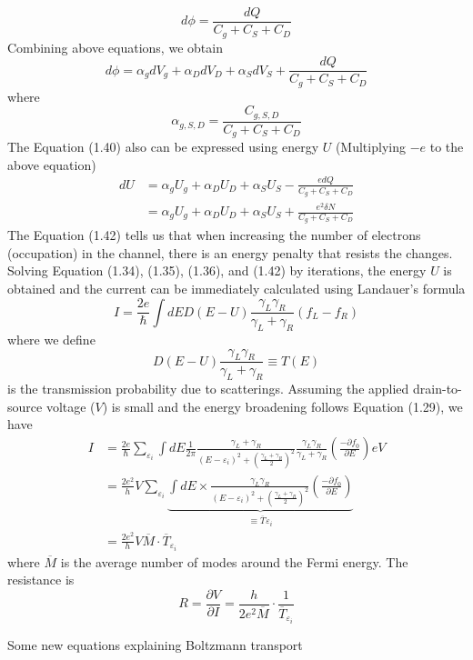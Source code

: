 \begin{equation}
    d\phi = \frac{dQ}{C_{g}+C_{S}+C_{D}}
\end{equation} Combining above equations, we obtain \begin{equation}
    d\phi = \alpha_{g} dV_{g} + \alpha_{D} dV_{D} + \alpha_{S} dV_{S} + \frac{dQ}{C_{g}+C_{S}+C_{D}}
\end{equation} where \begin{equation}
    \alpha_{g,S,D} = \frac{C_{g,S,D}}{C_{g}+C_{S}+C_{D}}
\end{equation} The Equation (1.40) also can be expressed using energy $U$ (Multiplying $-e$ to the above equation) 
\begin{align}
    dU& = \alpha_{g} U_{g} + \alpha_{D} U_{D} + \alpha_{S} U_{S} - \frac{edQ}{C_{g}+C_{S}+C_{D}}\nonumber\\
    & = \alpha_{g} U_{g} + \alpha_{D} U_{D} + \alpha_{S} U_{S} + \frac{e^{2}\delta N}{C_{g}+C_{S}+C_{D}}
\end{align} The Equation (1.42) tells us that when increasing the number of electrons (occupation) in the channel, there is an energy penalty that resists the changes. Solving Equation (1.34), (1.35), (1.36), and (1.42) by iterations, the energy $U$ is obtained and the current can be immediately calculated using Landauer's formula \begin{equation}
    I = \frac{2e}{\hbar}\int dE D\left(E-U\right) \frac{\gamma_{L}\gamma_{R}}{\gamma_{L}+\gamma_{R}} \left(f_{L}-f_{R}\right)
\end{equation} where we define 
\begin{equation}
    D\left(E-U\right) \frac{\gamma_{L}\gamma_{R}}{\gamma_{L}+\gamma_{R}} \equiv T\left(E\right)
\end{equation} is the transmission probability due to scatterings. Assuming the applied drain-to-source voltage ($V$) is small and the energy broadening follows Equation (1.29), we have 
\begin{align}
    I& = \frac{2e}{\hbar}\sum_{\varepsilon_{i}}{\int dE \frac{1}{2\pi}\frac{\gamma_{L}+\gamma_{R}}{\left(E-\varepsilon_{i}\right)^{2}+\left(\frac{\gamma_{L}+\gamma_{R}}{2}\right)^{2}} \frac{\gamma_{L}\gamma_{R}}{\gamma_{L}+\gamma_{R}} \left(\frac{-\partial f_{0}}{\partial E}\right)eV}\nonumber\\
    &= \frac{2e^2}{h}V\sum_{\varepsilon_{i}}{\underbrace{\int dE\times \frac{\gamma_{L}\gamma_{R}}{\left(E-\varepsilon_{i}\right)^{2}+\left(\frac{\gamma_{L}+\gamma_{R}}{2}\right)^{2}} \left(\frac{-\partial f_{0}}{\partial E}\right)}_{\equiv \overline{T}_{}\varepsilon_{i}}}\nonumber\\
    &= \frac{2e^{2}}{h}V\overline{M}\cdot\overline{T}_{\varepsilon_{i}}
\end{align} where $\overline{M}$ is the average number of modes around the Fermi energy. The resistance is \begin{equation}
    R = \frac{\partial V}{\partial I} = \frac{h}{2e^{2}\overline{M}}\cdot\frac{1}{\overline{T}_{\varepsilon_{i}}}
\end{equation} 

Some new equations explaining Boltzmann transport
